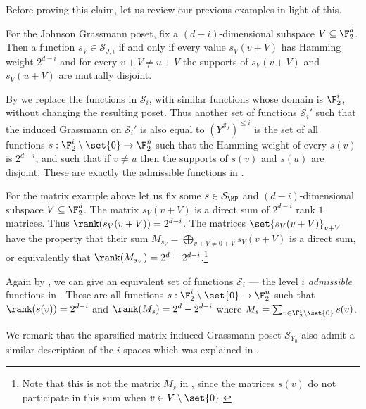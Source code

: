 Before proving this claim, let us review our previous examples in light of this.

\begin{example} \label{ex:johnson-subspaces}
    For the Johnson Grassmann poset, fix a \((d-i)\)-dimensional subspace \(V \subseteq \F_2^d\). Then a function \(s_V \in \mathcal{S}_{J,i}\) if and only if every value \(s_V(v+V)\) has Hamming weight \(2^{d-i}\) and for every \(v+V \ne u+V\) the supports of \(s_V(v+V)\) and \(s_V(u+V)\) are mutually disjoint. 

    By  we replace the functions in \(\mathcal{S}_i\), with similar functions whose domain is \(\F_2^i\), without changing the resulting poset. Thus another set of functions \(\mathcal{S}_i'\) such that the induced Grassmann on \(\mathcal{S}_i'\) is also equal to \((Y^{\mathcal{S}_J})^{\leq i}\) is the set of all functions \(s:\F_2^i \setminus \set{0} \to \F_2^n\) such that the Hamming weight of every \(s(v)\) is \(2^{d-i}\), and such that if \(v \ne u\) then the supports of \(s(v)\) and \(s(u)\) are disjoint. These are exactly the admissible functions in . %
\end{example}

\begin{example}
    For the matrix example above let us fix some \(s \in \mathcal{S}_{\MP}\) and \((d-i)\)-dimensional subspace \(V \subseteq \F_2^d\). The matrix \(s_V(v+V)\) is a direct sum of \(2^{d-i}\) rank \(1\) matrices. Thus \(\rank(s_V(v+V)) = 2^{d-i}\). The matrices \(\set{s_V(v+V)}_{v+V}\) have the property that their sum \(M_{s_V} = \bigoplus_{v+V \ne 0+V} s_V(v+V)\) is a direct sum, or equivalently that \(\rank(M_{s_V}) = 2^{d}-2^{d-i}\).\footnote{Note that this is not the matrix \(M_s\) in , since the matrices \(s(v)\) do not participate in this sum when \(v \in V \setminus \set{0}\).}
    
    Again by , we can give an equivalent set of functions \(\mathcal{S}_i\) --- the level \(i\) \emph{admissible} functions in . These are all functions \(s:\F_2^i \setminus \set{0} \to \F_2^n\) such that \(\rank(s(v)) = 2^{d-i}\) and \(\rank(M_s)=2^d - 2^{d-i}\) where \(M_s = \sum_{v \in \F_2^i \setminus \set{0}}s(v)\).
\end{example}
We remark that the sparsified matrix induced Grassmann poset \(\mathcal{S}_{Y_0}\) also admit a similar description of the \(i\)-spaces which was explained in .

